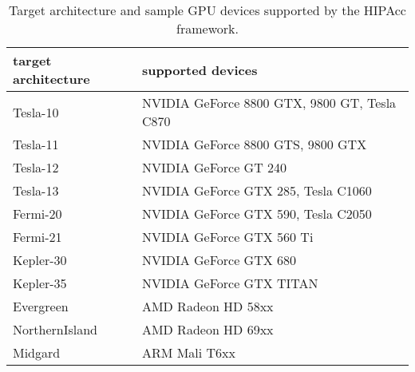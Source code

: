 \begin{table}
    \centering
    \begin{tabular}{ll}
\hline
target architecture \qquad& supported devices \\
\hline
Tesla-10                & NVIDIA GeForce 8800 GTX, 9800 GT, Tesla C870 \\
Tesla-11                & NVIDIA GeForce 8800 GTS, 9800 GTX \\
Tesla-12                & NVIDIA GeForce GT 240 \\
Tesla-13                & NVIDIA GeForce GTX 285, Tesla C1060 \\
Fermi-20                & NVIDIA GeForce GTX 590, Tesla C2050 \\
Fermi-21                & NVIDIA GeForce GTX 560 Ti \\
Kepler-30               & NVIDIA GeForce GTX 680 \\
Kepler-35               & NVIDIA GeForce GTX TITAN \\
\hline
Evergreen               & AMD Radeon HD 58xx \\
NorthernIsland          & AMD Radeon HD 69xx \\
\hline
Midgard                 & ARM Mali T6xx \\
\hline
    \end{tabular}
    \caption{Target architecture and sample GPU devices supported by the
    \ac{HIPAcc} framework.}\label{tab:cc}
\end{table}

